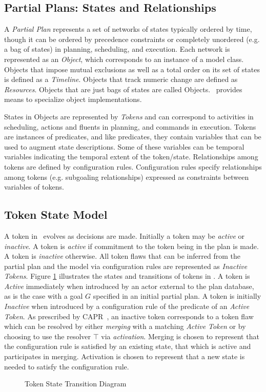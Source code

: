 \documentclass[10pt, letterpaper, twoside]{article}
\begin{document}
\subsection{Partial Plans: States and Relationships}
\label{partial}
A {\em Partial Plan} represents a set of networks of states typically
ordered by time, though it can be ordered by precedence constraints or
completely unordered (e.g. a bag of states) in planning, scheduling, and
execution. Each network is represented as an {\em Object}, which
corresponds to an instance of a model class.  Objects that impose
mutual exclusions as well as a total order on its set of states is defined
as a {\em Timeline}. Objects that track numeric change are defined as
{\em Resources}.  Objects that are just bags of states are called
Objects. \ET\, provides means to specialize object implementations.

States in Objects are represented by {\em Tokens} and can correspond to
activities in scheduling, actions and fluents in planning, and commands in
execution. Tokens are instances of predicates, and like predicates, they
contain variables that can be used to augment state descriptions. Some of
these variables can be temporal variables indicating the temporal extent of
the token/state.  Relationships among tokens are defined by configuration
rules.  Configuration rules specify relationships among tokens (e.g.
subgoaling relationships) expressed as constraints between variables of
tokens.

\subsection{Token State Model}
\label{token-state}
A token in \ET\, evolves as decisions are made.  Initially a token may be
{\em active} or {\em inactive}.  A token is {\em active} if commitment to
the token being in the plan is made.  A token is {\em inactive} otherwise. 
All token flaws that can be inferred from the partial plan and the model
via configuration rules are represented as {\em Inactive Tokens}. Figure
\ref{TokenStateTransition} illustrates the states and transitions of tokens
in \ET. A token is {\em Active} immediately when introduced by an actor
external to the plan database, as is the case with a goal $G$ specified in
an initial partial plan. A token is initially {\em Inactive} when
introduced by a configuration rule of the predicate of an {\em Active
Token}.  As prescribed by CAPR~\cite{europa2}, an inactive token corresponds to
a token flaw which can be resolved by either {\em merging} with a matching
{\em Active Token} or by choosing to use the resolver $\top$ via {\em
activation}. Merging is chosen to represent that the configuration rule is
satisfied by an existing state, that which is active and participates in
merging. Activation is chosen to represent that a new state is needed to
satisfy the configuration rule. 
\begin{figure}[t]
\centering{}
\caption{Token State Transition Diagram}
\label{TokenStateTransition}
\end{figure}
\end{document}
